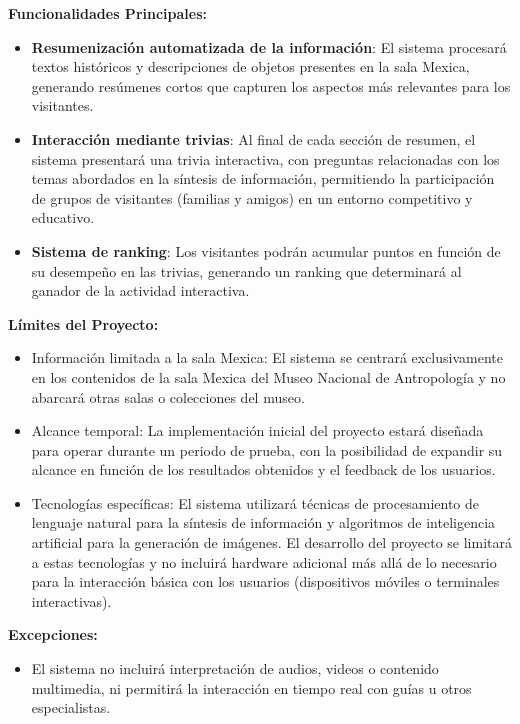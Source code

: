 \documentclass{report}
\begin{document}
    \textbf{Funcionalidades Principales:}
    \begin{itemize}
        \item \textbf{Resumenización automatizada de la información}: El sistema procesará textos históricos y descripciones de objetos presentes en la sala Mexica, generando resúmenes cortos que capturen los aspectos más relevantes para los visitantes.
        \item \textbf{Interacción mediante trivias}: Al final de cada sección de resumen, el sistema presentará una trivia interactiva, con preguntas relacionadas con los temas abordados en la síntesis de información, permitiendo la participación de grupos de visitantes (familias y amigos) en un entorno competitivo y educativo.
        \item \textbf{Sistema de ranking}: Los visitantes podrán acumular puntos en función de su desempeño en las trivias, generando un ranking que determinará al ganador de la actividad interactiva.
    \end{itemize}
        
    \textbf{Límites del Proyecto:}
    \begin{itemize}
        \item Información limitada a la sala Mexica: El sistema se centrará exclusivamente en los contenidos de la sala Mexica del Museo Nacional de Antropología y no abarcará otras salas o colecciones del museo.
        \item Alcance temporal: La implementación inicial del proyecto estará diseñada para operar durante un periodo de prueba, con la posibilidad de expandir su alcance en función de los resultados obtenidos y el feedback de los usuarios.
        \item Tecnologías específicas: El sistema utilizará técnicas de procesamiento de lenguaje natural para la síntesis de información y algoritmos de inteligencia artificial para la generación de imágenes. El desarrollo del proyecto se limitará a estas tecnologías y no incluirá hardware adicional más allá de lo necesario para la interacción básica con los usuarios (dispositivos móviles o terminales interactivas).
    \end{itemize}
        
    \textbf{Excepciones:}
    \begin{itemize}
        \item El sistema no incluirá interpretación de audios, videos o contenido multimedia, ni permitirá la interacción en tiempo real con guías u otros especialistas.
    \end{itemize}
        
\end{document}
